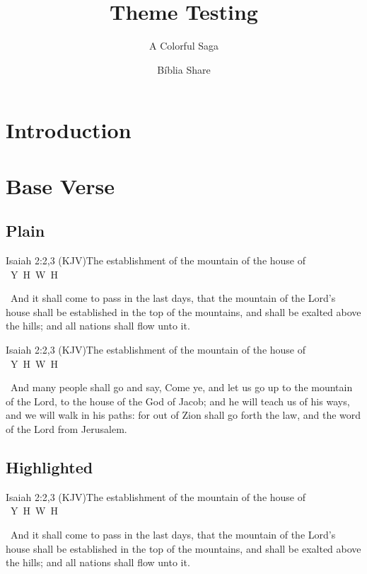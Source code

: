 \documentclass[12pt,aspectratio=169]{beamer}
\title{Theme Testing}
\subtitle{A Colorful Saga}
\author{Bíblia Share}
\date{\space}%
\newcommand{\YA}{%
    \mbox{%
        Y\makebox[0pt][l]{\hspace{-0.178em}\raisebox{-0.00ex}{\scalebox{0.30}{E}}}%
        H\makebox[0pt][l]{\hspace{-0.010em}\raisebox{-0.00ex}{\scalebox{0.30}{O}}}%
        W\makebox[0pt][l]{\hspace{-0.245em}\raisebox{-0.00ex}{\scalebox{0.30}{A}}}%
        H%
    }%
}
\newcommand{\ver}[1]{%
    \raisebox{0.50ex}{%
        \scalebox{1.1}{%
            \pmb{\textbf{\textcolor{BSpbg}{#1}}}%
        }%
    }%
}
\newcommand{\QUOTE}[1]{%
    \par\noindent\hspace*{0.1\linewidth}%
    \begin{minipage}{0.8\linewidth}%
        \linespread{1.50}\large{#1}%
    \end{minipage}%
}
\newcommand{\RED}[1]{{\textcolor{TXred}{#1}}}
\newcommand{\YEL}[1]{{\textcolor{TXyel}{#1}}}
\newcommand{\GRE}[1]{{\textcolor{TXgre}{#1}}}
\newcommand{\CYA}[1]{{\textcolor{TXcya}{#1}}}
\begin{document}
    \begin{frame}
        \titlepage
    \end{frame}
    \section{Introduction}
    \section{Base Verse}
    \subsection{Plain}

    \begin{frame}{Isaiah 2:2,3 (KJV)}{The establishment of the mountain of the house of \YA}
        \QUOTE{%
            \ver{2}~And it shall come to pass in the last days, that the mountain of the
            Lord's house shall be established in the top of the mountains, and shall  be
            exalted above the hills; and all nations shall flow unto it.
        }
    \end{frame}

    \begin{frame}{Isaiah 2:2,3 (KJV)}{The establishment of the mountain of the house of \YA}
        \QUOTE{%
            \ver{3}~And many people shall go and say, Come ye, and let us go up  to  the
            mountain of the Lord, to the house of the God of Jacob; and he will teach us
            of his ways, and we will walk in his paths: for out of Zion shall  go  forth
            the law, and the word of the Lord from Jerusalem.
        }
    \end{frame}

    \subsection{Highlighted}

    \begin{frame}{Isaiah 2:2,3 (KJV)}{The establishment of the mountain of the house of \YA}
        \QUOTE{%
            \ver{2}~And \RED{it shall come to pass} in the last days, that the  mountain
            of the Lord's house shall  be  \YEL{established}  in  the  \CYA{top  of  the
            mountains}, and  shall  be  \CYA{exalted}  above  the  hills;  and  \GRE{all
            nations} shall flow unto it.
        }
    \end{frame}
\end{document}
